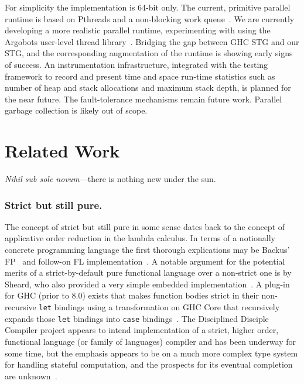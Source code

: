 \documentclass{llncs}
\begin{document}
For simplicity the implementation is 64-bit only.
%
The current, primitive parallel runtime is based on Pthreads and a
non-blocking work queue~\cite{Michael:1996}.  We are currently developing a
more realistic parallel runtime, experimenting with using the Argobots
user-level thread library~\cite{Seo:2015}.
%
Bridging the gap between GHC STG and our STG, and the corresponding
augmentation of the runtime is showing early signs of success.
%
An instrumentation infrastructure, integrated with the testing framework to
record and present time and space run-time statistics such as number of heap
and stack allocations and maximum stack depth, is planned for the near future.
%
The fault-tolerance mechanisms remain future work.
%
Parallel garbage collection is likely out of scope.
%


\section{Related Work}

\emph{Nihil sub sole novum}---there is nothing new under the sun. %


\subsubsection{Strict but still pure.}
The concept of strict but still pure in some sense dates back to the concept
of applicative order reduction in the lambda calculus.  In terms of a
notionally concrete programming language the first thorough explications may
be Backus' FP~\cite{Backus:1978} and follow-on FL
implementation~\cite{AikenFL,FLreport89}.
%
A notable argument for the potential merits of a strict-by-default
pure functional language over a non-strict one is by Sheard, who also provided
a very simple embedded implementation~\cite{Sheard:2003}.
%
A plug-in for GHC (prior to 8.0) exists that makes function bodies strict in
their non-recursive \texttt{let} bindings using a transformation on GHC Core
that recursively expands those \texttt{let} bindings into \texttt{case}
bindings~\cite{Bolingbroke:2008,strict-ghc-plugin}.
%
The Disciplined Disciple Compiler project appears to intend implementation of
a strict, higher order, functional language (or family of languages) compiler
and has been underway for some time, but the emphasis appears to be on a much
more complex type system for handling stateful computation, and the prospects
for its eventual completion are unknown~\cite{disciplined-disciple}.
\end{document}
